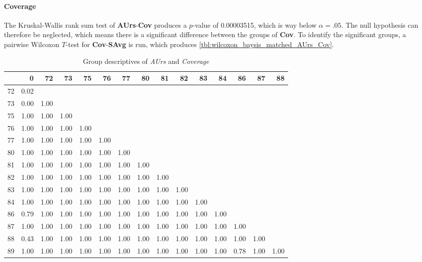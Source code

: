 \paragraph{Coverage}
The Kruskal-Wallis rank sum test of \textbf{AUrs}-\textbf{Cov} produces a $p$-value of 0.00003515, which is way below $\alpha=.05$. The null hypothesis can therefore be neglected, which means there is a significant difference between the groups of \textbf{Cov}. To identify the significant groups, a pairwise Wilcoxon $T$-test for \textbf{Cov}-\textbf{SAvg} is run, which produces \autoref{tbl:wilcoxon_baysis_matched_AUrs_Cov}.
\begin{table}[ht]
	\small
	\centering
    \begin{tabular}{rrrrrrrrrrrrrrr}
        \hline
       & 0 & 72 & 73 & 75 & 76 & 77 & 80 & 81 & 82 & 83 & 84 & 86 & 87 & 88 \\ 
        \hline
      72 & 0.02 &  &  &  &  &  &  &  &  &  &  &  &  &  \\ 
        73 & 0.00 & 1.00 &  &  &  &  &  &  &  &  &  &  &  &  \\ 
        75 & 1.00 & 1.00 & 1.00 &  &  &  &  &  &  &  &  &  &  &  \\ 
        76 & 1.00 & 1.00 & 1.00 & 1.00 &  &  &  &  &  &  &  &  &  &  \\ 
        77 & 1.00 & 1.00 & 1.00 & 1.00 & 1.00 &  &  &  &  &  &  &  &  &  \\ 
        80 & 1.00 & 1.00 & 1.00 & 1.00 & 1.00 & 1.00 &  &  &  &  &  &  &  &  \\ 
        81 & 1.00 & 1.00 & 1.00 & 1.00 & 1.00 & 1.00 & 1.00 &  &  &  &  &  &  &  \\ 
        82 & 1.00 & 1.00 & 1.00 & 1.00 & 1.00 & 1.00 & 1.00 & 1.00 &  &  &  &  &  &  \\ 
        83 & 1.00 & 1.00 & 1.00 & 1.00 & 1.00 & 1.00 & 1.00 & 1.00 & 1.00 &  &  &  &  &  \\ 
        84 & 1.00 & 1.00 & 1.00 & 1.00 & 1.00 & 1.00 & 1.00 & 1.00 & 1.00 & 1.00 &  &  &  &  \\ 
        86 & 0.79 & 1.00 & 1.00 & 1.00 & 1.00 & 1.00 & 1.00 & 1.00 & 1.00 & 1.00 & 1.00 &  &  &  \\ 
        87 & 1.00 & 1.00 & 1.00 & 1.00 & 1.00 & 1.00 & 1.00 & 1.00 & 1.00 & 1.00 & 1.00 & 1.00 &  &  \\ 
        88 & 0.43 & 1.00 & 1.00 & 1.00 & 1.00 & 1.00 & 1.00 & 1.00 & 1.00 & 1.00 & 1.00 & 1.00 & 1.00 &  \\ 
        89 & 1.00 & 1.00 & 1.00 & 1.00 & 1.00 & 1.00 & 1.00 & 1.00 & 1.00 & 1.00 & 1.00 & 0.78 & 1.00 & 1.00 \\ 
         \hline
      \end{tabular}
	\caption{Group descriptives of \textit{AUrs} and \textit{Coverage}}
	\label{tbl:wilcoxon_baysis_matched_AUrs_Cov}
\end{table}

